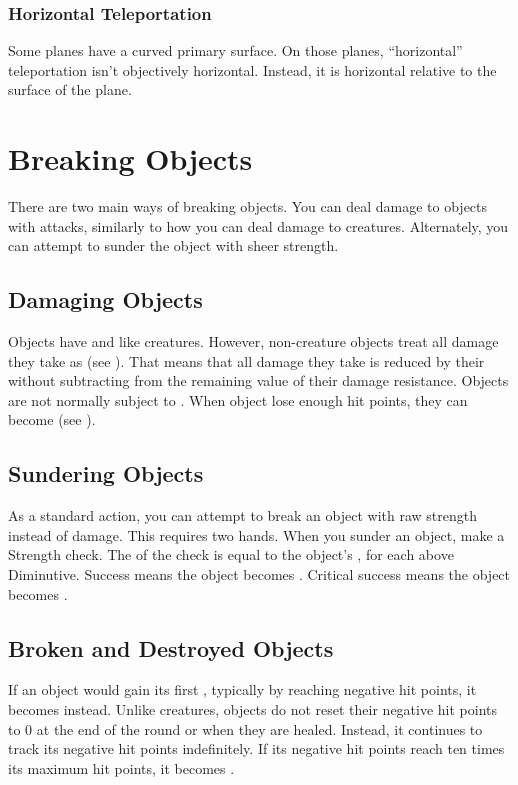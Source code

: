     \subsubsection{Horizontal Teleportation}
      Some planes have a curved primary surface.
      On those planes, ``horizontal'' teleportation isn't objectively horizontal.
      Instead, it is horizontal relative to the surface of the plane.

\section{Breaking Objects}
  There are two main ways of breaking objects.
  You can deal damage to objects with attacks, similarly to how you can deal damage to creatures.
  Alternately, you can attempt to sunder the object with sheer strength.

  \subsection{Damaging Objects}
    Objects have  and  like creatures.
    However, non-creature objects treat all damage they take as  (see ).
    That means that all damage they take is reduced by their  without subtracting from the remaining value of their damage resistance.
    Objects are not normally subject to .
    When object lose enough hit points, they can become  (see ).

  \subsection{Sundering Objects}
    As a standard action, you can attempt to break an object with raw strength instead of damage.
    This requires two hands.
    When you sunder an object, make a Strength check.
    The  of the check is equal to the object's ,  for each  above Diminutive.
    Success means the object becomes .
    Critical success means the object becomes .

  \subsection{Broken and Destroyed Objects}\label{Broken and Destroyed Objects}
    If an object would gain its first , typically by reaching negative hit points, it becomes  instead.
    Unlike creatures, objects do not reset their negative hit points to 0 at the end of the round or when they are healed.
    Instead, it continues to track its negative hit points indefinitely.
    If its negative hit points reach ten times its maximum hit points, it becomes .


